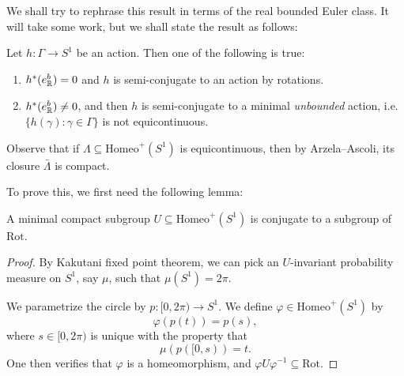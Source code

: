 \documentclass[a4paper]{article}
\newcommand\Homeo{\mathrm{Homeo}}
\newcommand\Rot{\mathrm{Rot}}
\begin{document}
We shall try to rephrase this result in terms of the real bounded Euler class. It will take some work, but we shall state the result as follows:

\begin{cor}
  Let $h\colon \Gamma \to S^1$ be an action. Then one of the following is true:
  \begin{enumerate}
    \item $h^*(e^b_{\mathbb{R}}) = 0$ and $h$ is semi-conjugate to an action by rotations.
    \item $h^*(e^b_{\mathbb{R}}) \not= 0$, and then $h$ is semi-conjugate to a minimal \emph{unbounded} action, i.e.\ $\{h(\gamma): \gamma \in \Gamma\}$ is not equicontinuous.
  \end{enumerate}
\end{cor}
Observe that if $\Lambda \subseteq \Homeo^+(S^1)$ is equicontinuous, then by Arzela--Ascoli, its closure $\bar{\Lambda}$ is compact.

To prove this, we first need the following lemma:

\begin{lemma}
  A minimal compact subgroup $U \subseteq \Homeo^+(S^1)$ is conjugate to a subgroup of $\Rot$.
\end{lemma}

\begin{proof}
  By Kakutani fixed point theorem, we can pick an $U$-invariant probability measure on $S^1$, say $\mu$, such that $\mu(S^1) = 2\pi$.

  We parametrize the circle by $p\colon [0, 2\pi) \to S^1$. We define $\varphi \in \Homeo^+(S^1)$ by
  \[
    \varphi(p(t)) = p(s),
  \]
  where $s \in [0, 2\pi)$ is unique with the property that
  \[
    \mu(p([0, s)) = t.
  \]
  One then verifies that $\varphi$ is a homeomorphism, and $\varphi U \varphi^{-1} \subseteq \Rot$.
\end{proof}
\end{document}

